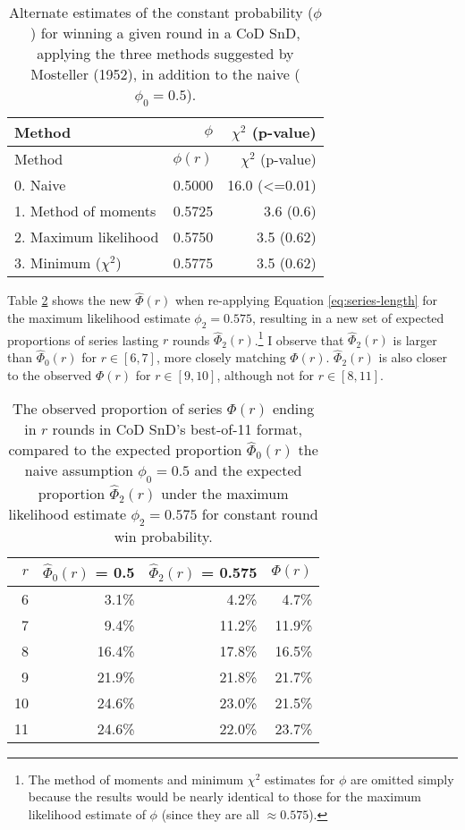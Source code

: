 \documentclass{article}
\begin{document}
\begin{longtable}[]{@{}lrr@{}}
\caption{Alternate estimates of the constant probability ($\phi$) for winning a given round in a CoD SnD, applying the three methods suggested by Mosteller (1952), in addition to the naive ($\phi_0 = 0.5$).}\label{tbl:mosteller-methods-results} \\
\toprule()
Method & $\phi$ & $\chi^2$ (p-value) \\
\midrule()
\endfirsthead
\toprule()
Method & $\phi(r)$ & $\chi^2$ (p-value) \\
\midrule()
\endhead
0. Naive & 0.5000 & 16.0 (\textless=0.01) \\
1. Method of moments & 0.5725 & 3.6 (0.6) \\
2. Maximum likelihood & 0.5750 & 3.5 (0.62) \\
3. Minimum ($\chi^2$) & 0.5775 & 3.5 (0.62) \\
\bottomrule()
\end{longtable}

Table \ref{tbl:expected-series-lengths-alternative-ps} shows the new
\(\hat{\Phi}(r)\) when re-applying Equation \ref{eq:series-length} for
the maximum likelihood estimate \(\phi_2 = 0.575\), resulting in a new
set of expected proportions of series lasting \(r\) rounds
\(\hat{\Phi}_2(r)\).\footnote{The method of moments and minimum
  \(\chi^2\) estimates for \(\phi\) are omitted simply because the
  results would be nearly identical to those for the maximum likelihood
  estimate of \(\phi\) (since they are all \(\approx 0.575\)).} I
observe that \(\hat{\Phi}_2(r)\) is larger than \(\hat{\Phi}_0(r)\) for
\(r \in [6, 7]\), more closely matching \(\Phi(r)\). \(\hat{\Phi}_2(r)\)
is also closer to the observed \(\Phi(r)\) for \(r \in [9, 10]\),
although not for \(r \in [8, 11]\).

\begin{longtable}[]{@{}rrrr@{}}
\caption{The observed proportion of series $\Phi(r)$ ending in $r$ rounds in CoD SnD's best-of-11 format, compared to the expected proportion $\hat{\Phi}_0(r)$ the naive assumption $\phi_0 = 0.5$ and the expected proportion $\hat{\Phi}_2(r)$ under the maximum likelihood estimate $\phi_2 = 0.575$ for constant round win probability.}\label{tbl:expected-series-lengths-alternative-ps} \\
\toprule()
$r$ & $\hat{\Phi}_0(r)$ = 0.5 & $\hat{\Phi}_2(r)$ = 0.575 & $\Phi(r)$ \\
\midrule()
\endhead
6 & 3.1\% & 4.2\% & 4.7\% \\
7 & 9.4\% & 11.2\% & 11.9\% \\
8 & 16.4\% & 17.8\% & 16.5\% \\
9 & 21.9\% & 21.8\% & 21.7\% \\
10 & 24.6\% & 23.0\% & 21.5\% \\
11 & 24.6\% & 22.0\% & 23.7\% \\
\bottomrule()
\end{longtable}
\end{document}
